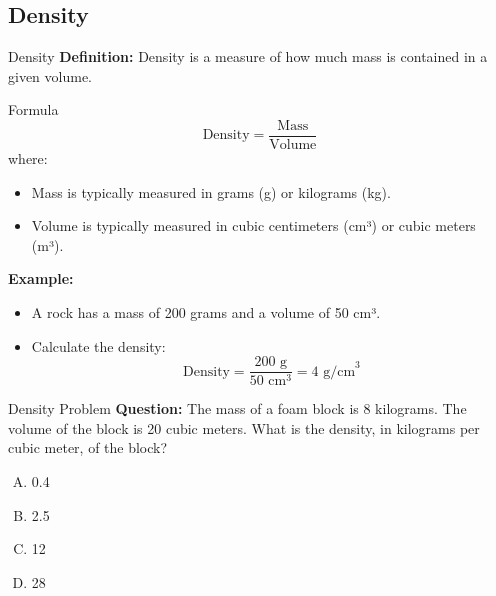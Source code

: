 \documentclass{beamer}
\begin{document}
\begin{frame}
\section{Density}
\end{frame}




\begin{frame}{Density}
\textbf{Definition:} Density is a measure of how much mass is contained in a given volume.

\begin{block}{Formula}
\[
\text{Density} = \frac{\text{Mass}}{\text{Volume}}
\]
where:
\begin{itemize}
    \item Mass is typically measured in grams (g) or kilograms (kg).
    \item Volume is typically measured in cubic centimeters (cm³) or cubic meters (m³).
\end{itemize}
\end{block}

\pause
\textbf{Example:}
\begin{itemize}
    \item A rock has a mass of 200 grams and a volume of 50 cm³.
    \item Calculate the density:
    \[
    \text{Density} = \frac{200 \text{ g}}{50 \text{ cm}^3} = 4 \text{ g/cm}^3
    \]
\end{itemize}


\end{frame}





\begin{frame}{Density Problem}
\textbf{Question:}  
The mass of a foam block is 8 kilograms. The volume of the block is 20 cubic meters. What is the density, in kilograms per cubic meter, of the block?

\begin{enumerate}[A.]
    \item 0.4
    \item 2.5
    \item 12
    \item 28
\end{enumerate}
\end{frame}
\end{document}
